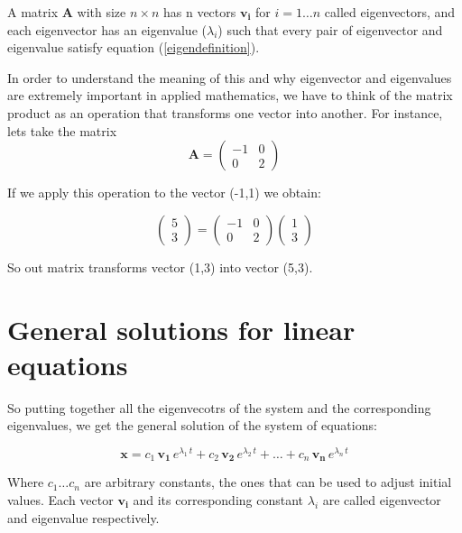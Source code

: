 \documentclass[12pt]{article}
\begin{document}
A matrix $\mathbf{A}$ with size $n \times n$ has n vectors $\mathbf{v_i}$ for $i = 1 \dots n$ called eigenvectors, and each eigenvector has an eigenvalue ($\lambda_i$) such that every pair of eigenvector and eigenvalue satisfy equation (\ref{eigendefinition}).
	
In order to understand the meaning of this and why eigenvector and eigenvalues are extremely important in applied mathematics, we have to think of the matrix product as an operation that transforms one vector into another. For instance, lets take the matrix
\begin{equation}
	\mathbf{A}  = \begin{pmatrix} -1 & 0\\ 0 & 2\end{pmatrix} 
\end{equation}



If we apply this operation to the vector (-1,1) we obtain:

\begin{equation}
	\begin{pmatrix}  5\\ 3  \end{pmatrix}  = \begin{pmatrix} -1 & 0\\ 0 & 2 \end{pmatrix} \begin{pmatrix}  1\\ 3  \end{pmatrix}
\end{equation}

So out matrix transforms vector (1,3) into vector (5,3).



\section{General solutions for linear equations}

So putting together all the eigenvecotrs of the system and the corresponding eigenvalues, we get the general solution of the system of equations:


\begin{equation}
	\label{odenvar_mat_sol}
	\mathbf{x}= c_1 \, \mathbf{v_1} \, e^{\lambda_1 \, t} + c_2 \, \mathbf{v_2} \, e^{\lambda_2 \, t} +  \dots + c_n \, \mathbf{v_n} \, e^{\lambda_n \, t}
\end{equation}

Where $c_1 \dots c_n$  are arbitrary constants, the ones that can be used to adjust initial values. Each vector $\mathbf{v_i}$ and its corresponding constant $\lambda_i$ are called eigenvector and eigenvalue respectively.
\end{document}
